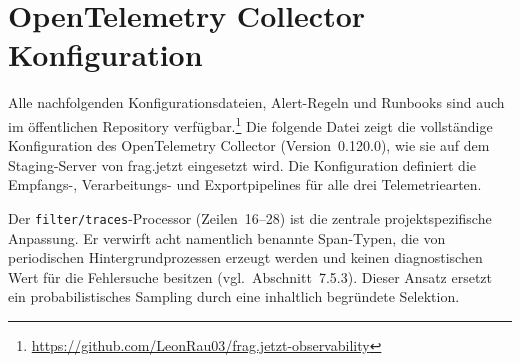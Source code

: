 \chapter{OpenTelemetry Collector Konfiguration}
\label{app:otel-collector}

Alle nachfolgenden Konfigurationsdateien, Alert-Regeln und Runbooks sind auch im öffentlichen Repository verfügbar.\footnote{\url{https://github.com/LeonRau03/frag.jetzt-observability}} Die folgende Datei zeigt die vollständige Konfiguration des OpenTelemetry Collector (Version~0.120.0), wie sie auf dem Staging-Server von frag.jetzt eingesetzt wird. Die Konfiguration definiert die Empfangs-, Verarbeitungs- und Exportpipelines für alle drei Telemetriearten.

Der \texttt{filter/traces}-Processor (Zeilen~16--28) ist die zentrale projektspezifische Anpassung. Er verwirft acht namentlich benannte Span-Typen, die von periodischen Hintergrundprozessen erzeugt werden und keinen diagnostischen Wert für die Fehlersuche besitzen (vgl.\ Abschnitt~7.5.3). Dieser Ansatz ersetzt ein probabilistisches Sampling durch eine inhaltlich begründete Selektion.

